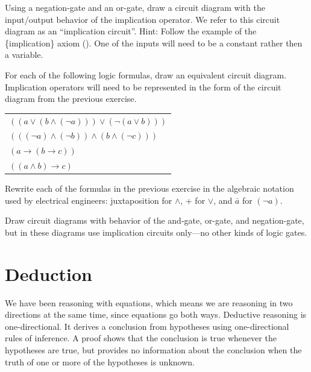 \begin{ExerciseList}
\Exercise Using a negation-gate and an or-gate, draw a circuit diagram with the input/output behavior of the implication operator. We refer to this circuit diagram as an ``implication circuit''.
Hint: Follow the example of the \{implication\} axiom (\pageref{implication}).
One of the inputs will need to be a constant rather then a variable.

\Exercise For each of the following logic formulas, draw an equivalent circuit diagram.
Implication operators will need to be represented in the form of the circuit diagram from the previous exercise.
\begin{center}
\begin{tabular}{l}
$((a \vee (b \wedge (\neg a))) \vee (\neg (a \vee b)))$ \\
$(((\neg a) \wedge (\neg b)) \wedge (b \wedge (\neg c)))$ \\
$(a \rightarrow (b \rightarrow c))$ \\
$((a \wedge b) \rightarrow c)$ \\
\end{tabular}
\end{center}

\Exercise Rewrite each of the formulas in the previous exercise
in the algebraic notation used by electrical engineers:
juxtaposition for $\wedge$, + for $\vee$, and $\bar{a}$ for $(\neg a)$.

\Exercise Draw circuit diagrams with behavior of the and-gate, or-gate, and negation-gate,
but in these diagrams use implication circuits only---no other kinds of logic gates.
\end{ExerciseList}


\section{Deduction}

We have been reasoning with equations, which means we are reasoning in two directions
at the same time, since equations go both ways. Deductive reasoning is one-directional.
It derives a conclusion from hypotheses using one-directional rules of inference.
A proof shows that the conclusion is true whenever the hypotheses are true, but provides
no information about the conclusion when the truth of one or more of the hypotheses is
unknown.

